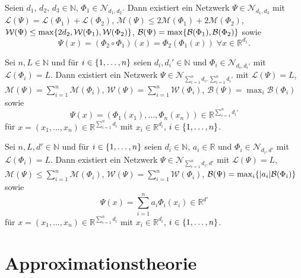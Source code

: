 \documentclass[11pt]{scrartcl}
\newcommand{\N}{\mathbb{N}} %
\newcommand{\R}{\mathbb{R}} %
\begin{document}
\begin{lemma}
    Seien \(d_1\), \(d_2\), \(d_3 \in \N\), \(\Phi_1 \in \mathcal{N}_{d_1, d_2}\). Dann existiert ein 
    Netzwerk \(\Psi \in \mathcal{N}_{d_1, d_3}\) mit \(\mathcal{L}(\Psi) = \mathcal{L}(\Phi_1) + \mathcal{L}(\Phi_2)\), 
    \(\mathcal{M}(\Psi) \leq 2 \mathcal{M}(\Phi_1) + 2\mathcal{M}(\Phi_2)\), \(\mathcal{W}(\Psi) \leq 
    \max\{2d_2, \mathcal{W}(\Phi_1), \mathcal{W}(\Phi_2)\}\), \(\mathcal{B}(\Psi) = \max\{\mathcal{B}(\Phi_1), \mathcal{B}(\Phi_2)\}\) 
    sowie
    \[ \Psi(x) = (\Phi_2 \circ \Phi_1)(x) = \Phi_2(\Phi_1(x)) \;\forall x\in \R^{d_1}. \]
\end{lemma}

\begin{lemma}
    Sei \(n, L \in\N\) und für \(i\in \{1,\ldots, n\}\) seien \(d_i, d_i' \in \N\) und \(\Phi_i \in \mathcal{N}_{d_i, d_i'}\) 
    mit \(\mathcal{L}(\Phi_i) = L\). Dann existiert ein Netzwerk \(\Psi \in \mathcal{N}_{\sum_{i=1}^n d_i, \sum_{i=1}^n d_i'}\) 
    mit \(\mathcal{L}(\Psi) = L\), \(\mathcal{M}(\Psi) = \sum_{i=1}^n \mathcal{M}(\Phi_i)\), 
    \(\mathcal{W}(\Psi) = \sum_{i=1}^n \mathcal{W}(\Phi_i)\), \(\mathcal{B}(\Psi) = \max_i \mathcal{B}(\Phi_i)\) sowie 
    \[ \Psi(x) = (\Phi_1(x_1), \ldots, \Phi_n(x_n)) \in \R^{\sum_{i=1}^n d_i'} \]
    für \(x = (x_1, \ldots, x_n) \in \R^{\sum_{i=1}^n d_i}\) mit \(x_i \in \R^{d_i}\), \(i\in \{1,\ldots, n\}\).
\end{lemma}

\begin{lemma}
    Sei \(n, L, d' \in\N\) und für \(i\in \{1,\ldots, n\}\) seien \(d_i \in \N\), \(a_i \in \R\) und \(\Phi_i \in \mathcal{N}_{d_i, d'}\) 
    mit \(\mathcal{L}(\Phi_i) = L\). Dann existiert ein Netzwerk \(\Psi \in \mathcal{N}_{\sum_{i=1}^n d_i, d'}\) 
    mit \(\mathcal{L}(\Psi) = L\), \(\mathcal{M}(\Psi) \leq \sum_{i=1}^n \mathcal{M}(\Phi_i)\), 
    \(\mathcal{W}(\Psi) = \sum_{i=1}^n \mathcal{W}(\Phi_i)\), \(\mathcal{B}(\Psi) = \max_i \{|a_i| \mathcal{B}(\Phi_i)\}\) sowie 
    \[ \Psi(x) = \sum_{i=1}^n a_i \Phi_i(x_i) \in \R^{d'} \]
    für \(x = (x_1, \ldots, x_n) \in \R^{\sum_{i=1}^n d_i}\) mit \(x_i \in \R^{d_i}\), \(i\in \{1,\ldots, n\}\).
\end{lemma}

\section{Approximationstheorie}
\end{document}
